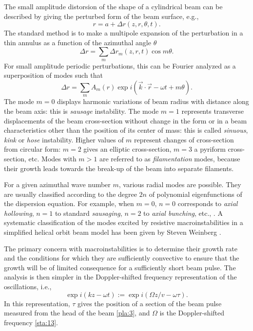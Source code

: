 \documentclass [12pt,a4paper,     ]{report} %
\newcommand{\DEF}{:=}                 %
\begin{document}
	The small amplitude distorsion of the shape of a cylindrical beam can be described by giving the perturbed form of the beam surface, e.g.,
%
\begin{equation}\label{mac:1} %
      r = a + \Delta r(z,r,\theta,t).
\end{equation}
%
The standard method is to make a multipole expansion of the perturbation in a thin annulus as a function of the azimuthal angle $\theta$
%
\begin{equation}\label{mac:2} %
     \Delta r = \sum_m \Delta r_m(z,r,t) \cos m\theta.
\end{equation}
%
For small amplitude periodic perturbations, this can be Fourier analyzed as a superposition of modes such that \cite{FINKE1961-}
%
\begin{equation}\label{mac:3} %
    \Delta r = \sum_m A_m(r) \exp i (\vec{k}\cdot\vec{r} - \omega t + m\theta).
\end{equation}
%
The mode $m=0$ displays harmonic variations of beam radius with distance along the beam axis: this is \emph{sausage} instability.  The mode $m=1$ represents transverse displacements of the beam cross-section without change in the form or in a beam characteristics other than the position of its center of mass: this is called \emph{sinuous}, \emph{kink} or \emph{hose} instability.  Higher values of $m$ represent changes of cross-section from circular form: $m=2$ gives an elliptic cross-section, $m=3$ a pyriform cross-section, etc.  Modes with $m>1$ are referred to as \emph{filamentation} modes, because their growth leads towards the break-up of the beam into separate filaments.

	For a given azimuthal wave number $m$, various radial modes are possible.  They are usually classified according to the degree $2n$ of polynomial eigenfunctions of the dispersion equation.  For example, when $m=0$, $n=0$ corresponds to \emph{axial hollowing}, $n=1$ to standard \emph{sausaging}, $n=2$ to \emph{axial bunching}, etc., \cite{UHM--1981-}.  A systematic classification of the modes excited by resistive macroinstabilities in a simplified helical orbit beam model has been given by Steven Weinberg \cite{WEINB1967-}.

	The primary concern with macroinstabilities is to determine their growth rate and the conditions for which they are sufficiently convective to ensure that the growth will be of limited consequence for a sufficiently short beam pulse.  The analysis is then simpler in the Doppler-shifted frequency representation of the oscillations, i.e.,
%
\begin{equation}\label{mac:4} %
        \exp i(kz - \omega t) \DEF  \exp i(\Omega z/v - \omega \tau).
\end{equation}
%
In this representation, $\tau$ gives the position of a section of the beam pulse measured from the head of the beam \eqref{pla:3}, and $\Omega$ is the Doppler-shifted frequency \eqref{sta:13}.
\end{document}
